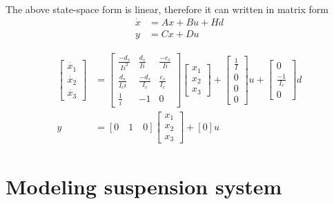 The above state-space form is linear, therefore it can written in matrix form
\begin{align}
	\dot{x} &= Ax + Bu + Hd \\
	y &= Cx + Du
\end{align}

\begin{align}
	\begin{bmatrix}
	\dot{x_1} \\ \dot{x_2} \\ \dot{x_3}
	\end{bmatrix} &= \begin{bmatrix}
		\frac{-d_s}{I i^2} & \frac{d_s}{I i} & \frac{-c_s}{I i} \\
		\frac{d_s}{I_c i} & \frac{-d_s}{I_c} & \frac{c_s}{I_c} \\
		\frac{1}{i} & -1 & 0
	\end{bmatrix} \begin{bmatrix}
	x_1 \\ x_2 \\ x_3
	\end{bmatrix} + \begin{bmatrix}
		\frac{1}{I} \\ 0 \\ 0 \\ 0
	\end{bmatrix} u + \begin{bmatrix}
		0 \\ \frac{-1}{I_c} \\ 0
	\end{bmatrix} d \\
	y &= [0 \quad 1 \quad 0] \begin{bmatrix}
	x_1 \\ x_2 \\ x_3
	\end{bmatrix} + [0]u
\end{align}

\section{Modeling suspension system}

